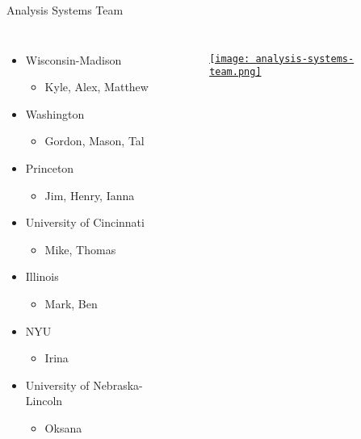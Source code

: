 \begin{frame}{Analysis Systems Team}
  \begin{columns}
    \begin{itemize}\setlength{\itemsep}{0.1 cm}
      \item Wisconsin-Madison
      \begin{itemize}
        \item Kyle, Alex, Matthew
      \end{itemize}
      \item Washington
      \begin{itemize}
        \item Gordon, Mason, Tal
      \end{itemize}
      \item Princeton
      \begin{itemize}
        \item Jim, Henry, Ianna
      \end{itemize}
      \item University of Cincinnati
      \begin{itemize}
        \item Mike, Thomas
      \end{itemize}
      \item Illinois
      \begin{itemize}
        \item Mark, Ben
      \end{itemize}
      \item NYU
      \begin{itemize}
        \item Irina
      \end{itemize}
      \item University of Nebraska-Lincoln
      \begin{itemize}
        \item Oksana
      \end{itemize}
    \end{itemize}
%
    \begin{figure}
        \begin{center}
            \href{https://iris-hep.org/as.html}{\texttt{[image: analysis-systems-team.png]}}
        \end{center}
    \end{figure}
  \end{columns}
\end{frame}

